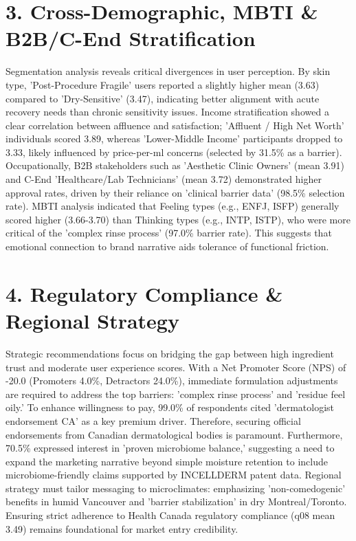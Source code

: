 \documentclass[10pt,twocolumn,a4paper]{article}
\begin{document}
\section{3. Cross-Demographic, MBTI \& B2B/C-End Stratification}
Segmentation analysis reveals critical divergences in user perception. By skin type, 'Post-Procedure Fragile' users reported a slightly higher mean (3.63) compared to 'Dry-Sensitive' (3.47), indicating better alignment with acute recovery needs than chronic sensitivity issues. Income stratification showed a clear correlation between affluence and satisfaction; 'Affluent / High Net Worth' individuals scored 3.89, whereas 'Lower-Middle Income' participants dropped to 3.33, likely influenced by price-per-ml concerns (selected by 31.5\% as a barrier). Occupationally, B2B stakeholders such as 'Aesthetic Clinic Owners' (mean 3.91) and C-End 'Healthcare/Lab Technicians' (mean 3.72) demonstrated higher approval rates, driven by their reliance on 'clinical barrier data' (98.5\% selection rate). MBTI analysis indicated that Feeling types (e.g., ENFJ, ISFP) generally scored higher (3.66-3.70) than Thinking types (e.g., INTP, ISTP), who were more critical of the 'complex rinse process' (97.0\% barrier rate). This suggests that emotional connection to brand narrative aids tolerance of functional friction.
\section{4. Regulatory Compliance \& Regional Strategy}
Strategic recommendations focus on bridging the gap between high ingredient trust and moderate user experience scores. With a Net Promoter Score (NPS) of -20.0 (Promoters 4.0\%, Detractors 24.0\%), immediate formulation adjustments are required to address the top barriers: 'complex rinse process' and 'residue feel oily.' To enhance willingness to pay, 99.0\% of respondents cited 'dermatologist endorsement CA' as a key premium driver. Therefore, securing official endorsements from Canadian dermatological bodies is paramount. Furthermore, 70.5\% expressed interest in 'proven microbiome balance,' suggesting a need to expand the marketing narrative beyond simple moisture retention to include microbiome-friendly claims supported by INCELLDERM patent data. Regional strategy must tailor messaging to microclimates: emphasizing 'non-comedogenic' benefits in humid Vancouver and 'barrier stabilization' in dry Montreal/Toronto. Ensuring strict adherence to Health Canada regulatory compliance (q08 mean 3.49) remains foundational for market entry credibility.
\end{document}
